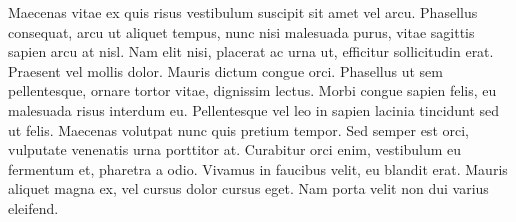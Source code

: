 Maecenas vitae ex quis risus vestibulum suscipit sit amet vel arcu. Phasellus consequat, arcu ut aliquet tempus, nunc nisi malesuada purus, vitae sagittis sapien arcu at nisl. Nam elit nisi, placerat ac urna ut, efficitur sollicitudin erat. Praesent vel mollis dolor. Mauris dictum congue orci. Phasellus ut sem pellentesque, ornare tortor vitae, dignissim lectus. Morbi congue sapien felis, eu malesuada risus interdum eu. Pellentesque vel leo in sapien lacinia tincidunt sed ut felis. Maecenas volutpat nunc quis pretium tempor. Sed semper est orci, vulputate venenatis urna porttitor at. Curabitur orci enim, vestibulum eu fermentum et, pharetra a odio. Vivamus in faucibus velit, eu blandit erat. Mauris aliquet magna ex, vel cursus dolor cursus eget. Nam porta velit non dui varius eleifend.